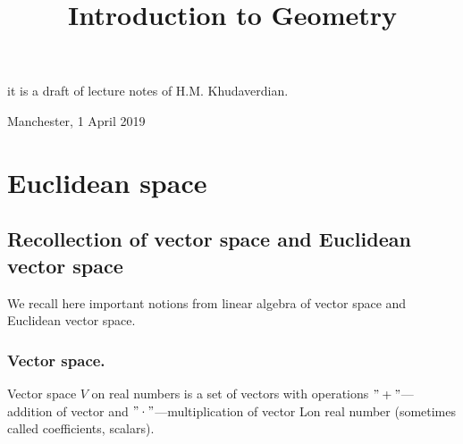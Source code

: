 \documentclass[12pt]{article}
\title{Introduction to  Geometry}
\date{}
\numberwithin{equation}{section}
\begin{document}
\maketitle

  \centerline {it is a draft of lecture notes of H.M. Khudaverdian.}

  \centerline { Manchester, 1 April 2019}

\tableofcontents
{}

\newpage
\section {Euclidean space}

\subsection{Recollection of vector space and Euclidean vector
space}

We recall here important notions from linear algebra
of vector space and Euclidean vector space.


\subsubsection {Vector space.}


\bigskip

Vector space $V$ on real numbers is a set of 
vectors with operations
$"+"$---addition of vector and 
$"\cdot"$---multiplication of vector
Lon real number (sometimes called coefficients, scalars). 

\m
\end{document}

